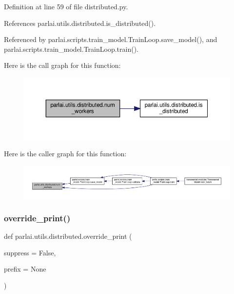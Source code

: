 Definition at line 59 of file distributed.\+py.



References parlai.\+utils.\+distributed.\+is\+\_\+distributed().



Referenced by parlai.\+scripts.\+train\+\_\+model.\+Train\+Loop.\+save\+\_\+model(), and parlai.\+scripts.\+train\+\_\+model.\+Train\+Loop.\+train().

Here is the call graph for this function\+:
\nopagebreak
\begin{figure}[H]
\begin{center}
\leavevmode
\includegraphics[width=350pt]{namespaceparlai_1_1utils_1_1distributed_a99b61b4756577c6542039c238d670dba_cgraph}
\end{center}
\end{figure}
Here is the caller graph for this function\+:
\nopagebreak
\begin{figure}[H]
\begin{center}
\leavevmode
\includegraphics[width=350pt]{namespaceparlai_1_1utils_1_1distributed_a99b61b4756577c6542039c238d670dba_icgraph}
\end{center}
\end{figure}
\mbox{\label{namespaceparlai_1_1utils_1_1distributed_a601345e55fc3fc3845c43efa1a04db56}} 
\subsubsection{\texorpdfstring{override\+\_\+print()}{override\_print()}}
{\footnotesize\ttfamily def parlai.\+utils.\+distributed.\+override\+\_\+print (\begin{DoxyParamCaption}\item[{}]{suppress = {\ttfamily False},  }\item[{}]{prefix = {\ttfamily None} }\end{DoxyParamCaption})}

